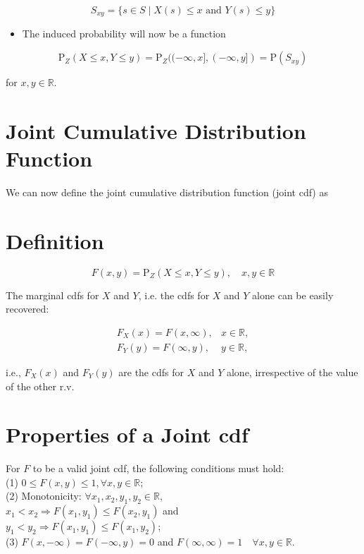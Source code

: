 \documentclass[10pt]{article}
\begin{document}
$$
S_{x y}=\{s \in S \mid X(s) \leq x \text { and } Y(s) \leq y\}
$$

\begin{itemize}
  \item The induced probability will now be a function
\end{itemize}

$$
\mathrm{P}_{Z}(X \leq x, Y \leq y)=\mathrm{P}_{Z}((-\infty, x],(-\infty, y])=\mathrm{P}\left(S_{x y}\right)
$$

for $x, y \in \mathbb{R}$.

\section*{Joint Cumulative Distribution Function}
We can now define the joint cumulative distribution function (joint cdf) as

\section*{Definition}
$$
F(x, y)=\mathrm{P}_{Z}(X \leq x, Y \leq y), \quad x, y \in \mathbb{R}
$$

The marginal cdfs for $X$ and $Y$, i.e. the cdfs for $X$ and $Y$ alone can be easily recovered:

$$
\begin{array}{ll}
F_{X}(x)=F(x, \infty), & x \in \mathbb{R}, \\
F_{Y}(y)=F(\infty, y), & y \in \mathbb{R},
\end{array}
$$

i.e., $F_{X}(x)$ and $F_{Y}(y)$ are the cdfs for $X$ and $Y$ alone, irrespective of the value of the other r.v.

\section*{Properties of a Joint cdf}
For $F$ to be a valid joint cdf, the following conditions must hold:\\
(1) $0 \leq F(x, y) \leq 1, \forall x, y \in \mathbb{R}$;\\
(2) Monotonicity: $\forall x_{1}, x_{2}, y_{1}, y_{2} \in \mathbb{R}$,\\
$x_{1}<x_{2} \Rightarrow F\left(x_{1}, y_{1}\right) \leq F\left(x_{2}, y_{1}\right)$ and\\
$y_{1}<y_{2} \Rightarrow F\left(x_{1}, y_{1}\right) \leq F\left(x_{1}, y_{2}\right)$;\\
(3) $F(x,-\infty)=F(-\infty, y)=0$ and $F(\infty, \infty)=1 \quad \forall x, y \in \mathbb{R}$.
\end{document}
